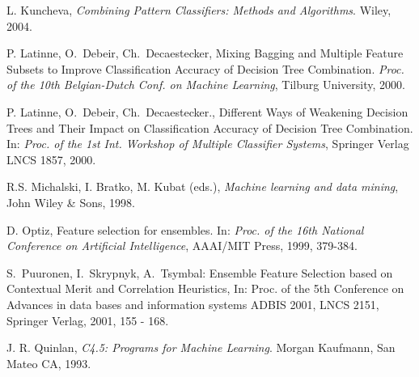 \documentclass[runningheads]{llncs}
\begin{document}
\begin{thebibliography}{19}
 L. Kuncheva, \emph{Combining Pattern Classifiers: Methods and
Algorithms}. Wiley, 2004.



 P. Latinne, O.~Debeir, Ch.~Decaestecker, Mixing Bagging
and Multiple Feature Subsets to Improve Classification Accuracy of Decision
Tree Combination. \emph{Proc. of the 10th Belgian-Dutch  Conf. on Machine
Learning}, Tilburg University, 2000.

 P. Latinne, O.~Debeir, Ch.~Decaestecker., Different Ways
of Weakening Decision Trees and Their Impact on Classification Accuracy of
Decision Tree Combination. In: \emph{Proc. of the 1st Int. Workshop of
Multiple Classifier Systems}, Springer Verlag LNCS 1857, 2000.






 R.S. Michalski, I. Bratko,  M. Kubat (eds.),
{\em Machine learning and data mining}, John Wiley \& Sons, 1998.


 D. Optiz, Feature selection for ensembles. In:
{\em Proc. of the 16th National Conference on Artificial Intelligence},
AAAI/MIT Press, 1999, 379-384.


 S.~Puuronen, I.~Skrypnyk, A.~Tsymbal: Ensemble Feature
Selection based on Contextual Merit and Correlation Heuristics,
In: Proc. of the 5th Conference on Advances in data bases and
information systems ADBIS 2001, LNCS 2151, Springer Verlag, 2001,
155 - 168.

  J. R. Quinlan, {\em C4.5: Programs for Machine
Learning}. Morgan Kaufmann, San Mateo CA, 1993.




\end{thebibliography}
\end{document}
